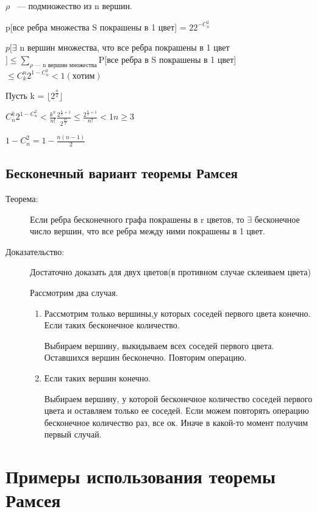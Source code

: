\documentclass[12pt]{article}
\begin{document}
\begin{description}
\begin{description}
$\rho$ ~--- подмножество из n вершин.

p[все ребра множества S покрашены в 1 цвет] = $22^{-C_n^2}$

$p[\exists$ n вершин множества, что все ребра покрашены в 1 цвет$] \le \sum_{\rho \text{~--- n вершин множества}}$P[все ребра в S покрашены в 1 цвет] $\le C_k^n 2^{1 - C_n^2} < 1(хотим)$

Пусть k = $\lfloor 2^{\frac{n}{2}} \rfloor$

$C_n^k2^{1 - C_n^2} < \frac{k^n}{n!}\frac{2^{\frac{n}{2} + 1}}{2^{\frac{n^2}{2}}} \le \frac{2^{\frac{n}{2} + 1}}{n!} < 1 n \ge 3$

$1 - C_n^2 = 1 - \frac{n(n - 1)}{2}$

\end{description}


\subsection{Бесконечный вариант теоремы Рамсея}

\begin{description}
\item[Теорема:] Если ребра бесконечного графа покрашены в r цветов, то $\exists$ бесконечное число вершин, что все ребра между ними покрашены в 1 цвет. 
\item[Доказательство:] Достаточно доказать для двух цветов(в противном случае склеиваем цвета)

Рассмотрим два случая.

\begin{enumerate}
\item Рассмотрим только вершины,у которых соседей первого цвета конечно. Если таких бесконечное количество. 

Выбираем вершину, выкидываем всех соседей первого цвета. Оставшихся вершин бесконечно. Повторим операцию.

\item 
Если таких вершин конечно. 

Выбираем вершину, у которой бесконечное количество соседей первого цвета и оставляем только ее соседей. Если можем повторять операцию бесконечное количество раз, все ок. Иначе в какой-то момент получим первый случай. 

\end{enumerate}

\end{description}

\section{Примеры использования теоремы Рамсея}


\end{description}
\end{document}
